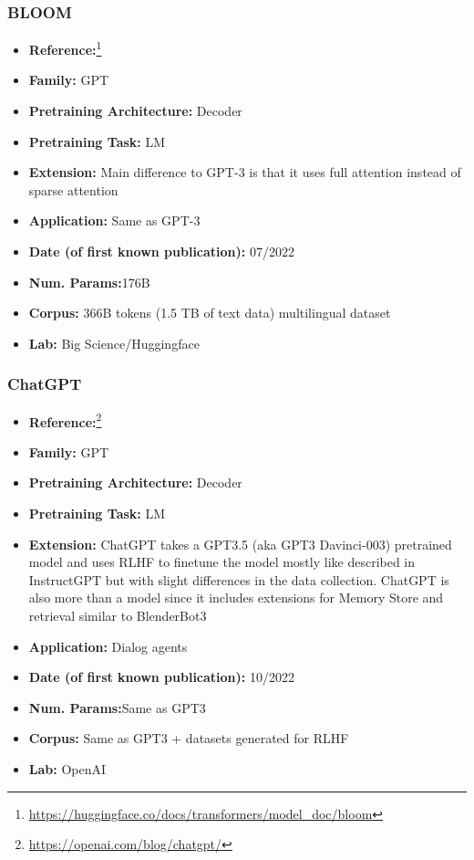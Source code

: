 \documentclass{article}
\begin{document}
\subsubsection{BLOOM}
            \begin{itemize}
                \item \textbf{Reference:}\footnote{\url{https://huggingface.co/docs/transformers/model_doc/bloom}}
                \item \textbf{Family:} GPT 
                \item \textbf{Pretraining Architecture:} Decoder
                \item \textbf{Pretraining Task:} LM
                \item \textbf{Extension:} Main difference to GPT-3 is that it uses full attention instead of sparse attention  
                \item \textbf{Application:} Same as GPT-3
                \item \textbf{Date (of first known publication):} 07/2022
                \item \textbf{Num. Params:}176B
                \item \textbf{Corpus:} 366B tokens (1.5 TB of text data) multilingual dataset
                \item \textbf{Lab:} Big Science/Huggingface
            \end{itemize}
            
\subsubsection{ChatGPT}

            \begin{itemize}
                \item \textbf{Reference:}\footnote{\url{https://openai.com/blog/chatgpt/}}
                \item \textbf{Family:} GPT 
                \item \textbf{Pretraining Architecture:} Decoder
                \item \textbf{Pretraining Task:} LM
                \item \textbf{Extension:} ChatGPT takes a GPT3.5 (aka GPT3 Davinci-003) pretrained model and uses RLHF to finetune the model mostly like described in InstructGPT but with slight differences in the data collection. ChatGPT is also more than a model since it includes extensions for Memory Store and retrieval similar to BlenderBot3  
                \item \textbf{Application:} Dialog agents
                \item \textbf{Date (of first known publication):} 10/2022
                \item \textbf{Num. Params:}Same as GPT3
                \item \textbf{Corpus:} Same as GPT3 + datasets generated for RLHF
                \item \textbf{Lab:} OpenAI
            \end{itemize}
\end{document}

